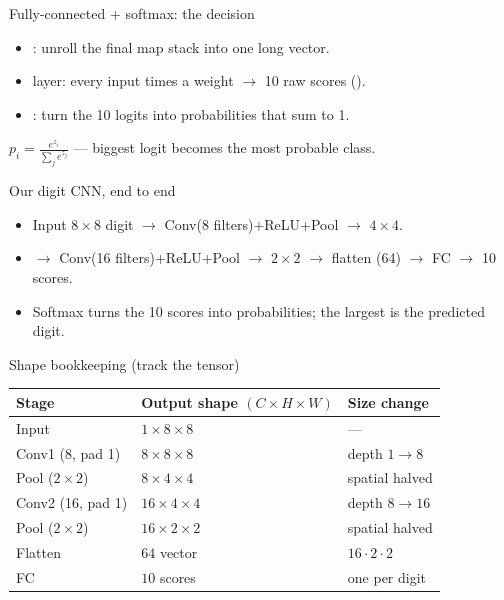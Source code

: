 \documentclass[10pt,aspectratio=169]{beamer}
\begin{document}
\begin{frame}{Fully-connected + softmax: the decision}
  \begin{itemize}
    \item {}: unroll the final map stack into one long vector.
    \item {} layer: every input times a weight $\rightarrow$ 10 raw scores ().
    \item {}: turn the 10 logits into probabilities that sum to 1.
  \end{itemize}
  \begin{mathbox}
    $\displaystyle p_i = \frac{e^{z_i}}{\sum_j e^{z_j}}$ \quad --- biggest logit becomes the most probable class.
  \end{mathbox}
\end{frame}

\begin{frame}{Our digit CNN, end to end}
  \begin{itemize}
    \item Input $8\times8$ digit $\rightarrow$ Conv(8 filters)+ReLU+Pool $\rightarrow$ $4\times4$.
    \item $\rightarrow$ Conv(16 filters)+ReLU+Pool $\rightarrow$ $2\times2$ $\rightarrow$ flatten (64) $\rightarrow$ FC $\rightarrow$ 10 scores.
    \item Softmax turns the 10 scores into probabilities; the largest is the predicted digit.
  \end{itemize}
\end{frame}

\begin{frame}{Shape bookkeeping (track the tensor)}
  \begin{center}
  \begin{tabular}{@{}lll@{}}
    \toprule
    \textbf{Stage} & \textbf{Output shape} $(C\times H\times W)$ & \textbf{Size change} \\
    \midrule
    Input            & $1\times8\times8$   & --- \\
    Conv1 (8, pad 1) & $8\times8\times8$   & depth $1\to8$ \\
    Pool ($2\times2$)& $8\times4\times4$   & spatial halved \\
    Conv2 (16, pad 1)& $16\times4\times4$  & depth $8\to16$ \\
    Pool ($2\times2$)& $16\times2\times2$  & spatial halved \\
    Flatten          & $64$ vector         & $16\cdot2\cdot2$ \\
    FC               & $10$ scores         & one per digit \\
    \bottomrule
  \end{tabular}
  \end{center}
\end{frame}
\end{document}
